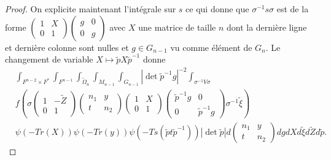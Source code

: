 \documentclass{amsart}
\begin{document}
\begin{proof}
On explicite maintenant l'intégrale sur $s$ ce qui donne que $\sigma^{-1}s \sigma$ est de la forme $\begin{pmatrix}
1 & X \\
0 & 1
\end{pmatrix} \begin{pmatrix}
g & 0 \\
0 & g
\end{pmatrix}$ avec $X$ une matrice de taille $n$ dont la dernière ligne et dernière colonne sont nulles et $g \in G_{n-1}$ vu comme élément de $G_n$.
Le changement de variable $X \mapsto \widetilde{p}X\widetilde{p}^{-1}$ donne
\begin{equation}
\begin{split}
& \int_{F^{n-2} \times F^*} \int_{F^{n-1}} \int_{\widetilde{\Omega}_n} \int_{M_{n-1}} \int_{G_{n-1}}  |\det \widetilde{p}^{-1}g|^{-2}\int_{\sigma^{-1}V\sigma} \\
& f\left(\sigma \begin{pmatrix}
1 & -\widetilde{Z} \\
0 & 1
\end{pmatrix}  \begin{pmatrix}
n_1 & y \\
t & n_2
\end{pmatrix} \begin{pmatrix}
1 & X \\
0 & 1
\end{pmatrix} \begin{pmatrix}
\widetilde{p}^{-1} g & 0 \\
0 & \widetilde{p}^{-1} g
\end{pmatrix} \sigma^{-1} \widetilde{\xi}\right) \\
& \psi(-Tr(X)) \psi(-Tr(y)) \psi(-Ts(\widetilde{p}t\widetilde{p}^{-1}))  |\det \widetilde{p}| d\begin{pmatrix}
n_1 & y \\
t & n_2
\end{pmatrix} dg dX d\widetilde{\xi} d\widetilde{Z} d\widetilde{p}.
\end{split}
\end{equation}


\end{proof}
\end{document}

